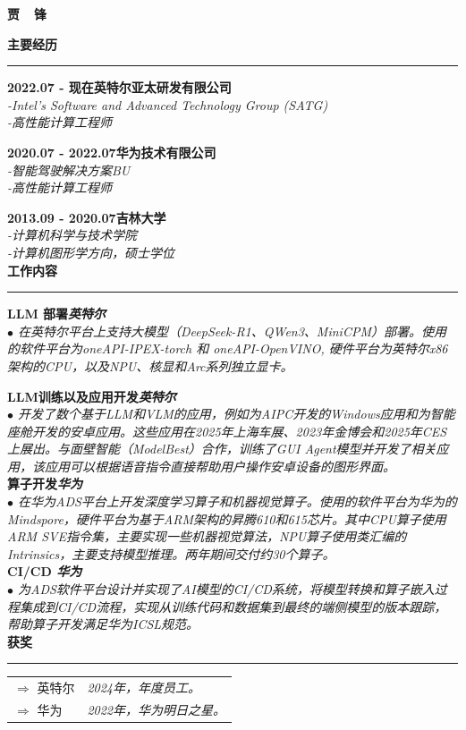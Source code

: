 \documentclass[a4paper,12pt,final]{memoir}
\newcommand{\myThemeColor}{RoyalBlue}
\newcommand{\SmallSep}{\vspace{0.9em}}
\newcommand{\CVSection}[1]
	{\Large\textbf{#1}\par
	\vspace{0.2cm}\normalsize\normalfont}
\newcommand{\CVItem}[1]
	{\textbf{\color{\myThemeColor} #1}}
\begin{document}
\Huge\bfseries {\color{\myThemeColor} 贾~~锋}\\
\normalsize\normalfont

\CVSection{主要经历}
\hrule
\SmallSep

\CVItem{2022.07 - 现在\hfill\textsc{英特尔亚太研发有限公司}}\\
\textit{-Intel's Software and Advanced Technology Group (SATG)}\\
\textit{-高性能计算工程师}

\CVItem{2020.07 - 2022.07\hfill\textsc{华为技术有限公司}}\\
\textit{-智能驾驶解决方案BU}\\
\textit{-高性能计算工程师}

\CVItem{2013.09 - 2020.07\hfill\textsc{吉林大学}}\\
\textit{-计算机科学与技术学院}\\
\textit{-计算机图形学方向，硕士学位}
\\

\CVSection{工作内容}
\hrule
\SmallSep
\CVItem{LLM 部署\hfill\emph{英特尔}}\\
\textit{$\bullet$ 在英特尔平台上支持大模型（DeepSeek-R1、QWen3、MiniCPM）部署。使用的软件平台为oneAPI-IPEX-torch 和 oneAPI-OpenVINO, 硬件平台为英特尔x86架构的CPU，以及NPU、核显和Arc系列独立显卡。}

\CVItem{LLM训练以及应用开发\hfill\emph{英特尔}}\\
\textit{$\bullet$ 
开发了数个基于LLM和VLM的应用，例如为AIPC开发的Windows应用和为智能座舱开发的安卓应用。这些应用在2025年上海车展、2023年金博会和2025年CES上展出。与面壁智能（ModelBest）合作，训练了GUI Agent模型并开发了相关应用，该应用可以根据语音指令直接帮助用户操作安卓设备的图形界面。} 
\\
\CVItem{算子开发\hfill\emph{华为}}\\
\textit{$\bullet$ 
在华为ADS平台上开发深度学习算子和机器视觉算子。使用的软件平台为华为的Mindspore，硬件平台为基于ARM架构的昇腾610和615芯片。其中CPU算子使用ARM SVE指令集，主要实现一些机器视觉算法，NPU算子使用类汇编的Intrinsics，主要支持模型推理。两年期间交付约30个算子。}
\\
\CVItem{CI/CD \hfill\emph{华为}}\\
\textit{$\bullet$ 
为ADS软件平台设计并实现了AI模型的CI/CD系统，将模型转换和算子嵌入过程集成到CI/CD流程，实现从训练代码和数据集到最终的端侧模型的版本跟踪，帮助算子开发满足华为ICSL规范。}
\\

\CVSection{获奖}
\hrule
\SmallSep
	\begin{tabular}{l|l}
		$\Rightarrow$ 英特尔&\textit{ 2024年，年度员工。}\footnotesize\\
		$\Rightarrow$ 华为&\textit{ 2022年，华为明日之星。}\\
	\end{tabular}

\end{document}
